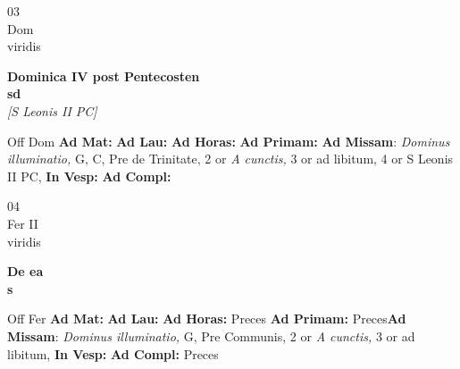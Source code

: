 \documentclass[10pt, openany]{book}
\begin{document}
    \begin{center}
        \begin{minipage}{3.5in}
            \vspace{2em}
            \begin{minipage}{0.5in}
                {\Huge 03} \\
                {\normalsize Dom} \\
                {\normalsize viridis}
            \end{minipage}
            \begin{minipage}{3.0in}
                \textbf{ \large Dominica IV post Pentecosten \\
                \textnormal{\normalsize sd}} \\ \textit{[S Leonis II PC]} \\ 
            \end{minipage}
            \begin{justify}Off Dom
                \textbf{Ad Mat: }
                \textbf{Ad Lau: }
                \textbf{Ad Horas: }
                \textbf{Ad Primam: }\textbf{Ad Missam}: \textit{Dominus illuminatio,} G, C, Pre de Trinitate, 2 or \textit{A cunctis,} 3 or ad libitum, 4 or S Leonis II PC,  
                \textbf{In Vesp: }
                \textbf{Ad Compl: }
            \end{justify}
        \end{minipage}
    \end{center}

    \begin{center}
        \begin{minipage}{3.5in}
            \vspace{2em}
            \begin{minipage}{0.5in}
                {\Huge 04} \\
                {\normalsize Fer II} \\
                {\normalsize viridis}
            \end{minipage}
            \begin{minipage}{3.0in}
                \textbf{ \large De ea \\
                \textnormal{\normalsize s}} \\ 
            \end{minipage}
            \begin{justify}Off Fer
                \textbf{Ad Mat: }
                \textbf{Ad Lau: }
                \textbf{Ad Horas: }Preces
                \textbf{Ad Primam: }Preces\textbf{Ad Missam}: \textit{Dominus illuminatio,} G, Pre Communis, 2 or \textit{A cunctis,} 3 or ad libitum,  
                \textbf{In Vesp: }
                \textbf{Ad Compl: }Preces
            \end{justify}
        \end{minipage}
    \end{center}
\end{document}
